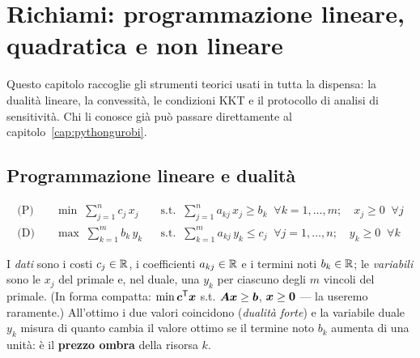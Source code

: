 \chapter[Richiami: LP, QP, NLP e analisi di sensitività]{Richiami: programmazione lineare,
quadratica e non lineare}
\label{cap:richiami}

Questo capitolo raccoglie gli strumenti teorici usati in tutta la dispensa: la dualità
lineare, la convessità, le condizioni KKT e il protocollo di analisi di sensitività.
Chi li conosce già può passare direttamente al capitolo~\ref{cap:pythongurobi}.

\section{Programmazione lineare e dualità}

\begin{modello}
\vspace{-1ex}
\begin{align*}
\text{(P)}\quad
& \min\; \sum_{j=1}^{n} c_j\, x_j
&& \text{s.t.}\;\; \sum_{j=1}^{n} a_{kj}\, x_j \ge b_k \;\; \forall k = 1, \dots, m;
   \quad x_j \ge 0 \;\; \forall j \\
\text{(D)}\quad
& \max\; \sum_{k=1}^{m} b_k\, y_k
&& \text{s.t.}\;\; \sum_{k=1}^{m} a_{kj}\, y_k \le c_j \;\; \forall j = 1, \dots, n;
   \quad y_k \ge 0 \;\; \forall k
\end{align*}
\end{modello}

I \emph{dati} sono i costi $c_j \in \mathbb{R}$, i coefficienti $a_{kj} \in \mathbb{R}$ e i termini
noti $b_k \in \mathbb{R}$; le \emph{variabili} sono le $x_j$ del primale e, nel duale, una
$y_k$ per ciascuno degli $m$ vincoli del primale. (In forma compatta:
$\min \boldsymbol{c}^{\mathsf T}\boldsymbol{x}$ s.t. $\boldsymbol{A} \boldsymbol{x} \ge \boldsymbol{b}$, $\boldsymbol{x} \ge \boldsymbol{0}$ --- la
useremo raramente.)
All'ottimo i due valori coincidono (\emph{dualità forte}) e la variabile duale $y_k$
misura di quanto cambia il valore ottimo se il termine noto $b_k$ aumenta di una unità:
è il \textbf{prezzo ombra} della risorsa $k$.

